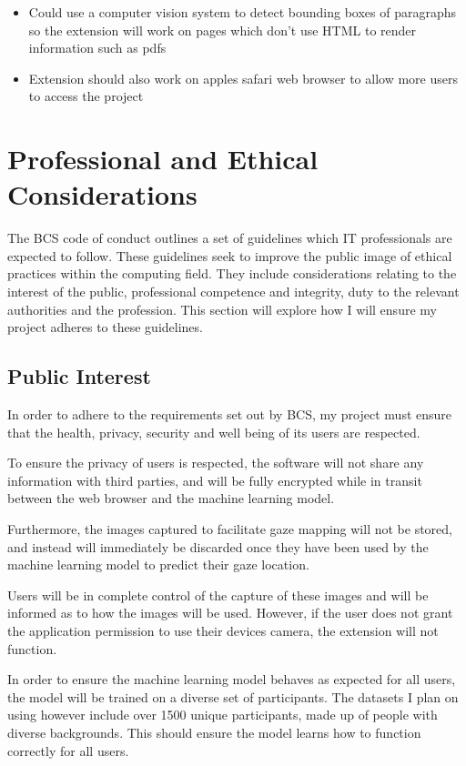 \documentclass[twocolumn]{report}
\begin{document}
\begin{itemize}
    \item Could use a computer vision system to detect bounding boxes of paragraphs so the extension will work on pages which don't use HTML to render information such as pdfs 
    \item Extension should also work on apples safari web browser to allow more users to access the project  
\end{itemize}

\chapter{Professional and Ethical Considerations}

\noindent
The BCS code of conduct \cite{bcs2022coc} outlines a set of guidelines which IT professionals are expected to follow. These guidelines seek to improve the public image of ethical practices within the computing field. They include considerations relating to the interest of the public, professional competence and integrity, duty to the relevant authorities and the profession. This section will explore how I will ensure my project adheres to these guidelines. 

\section{Public Interest}   

In order to adhere to the requirements set out by BCS, my project must ensure that the health, privacy, security and well being of its users are respected. 

To ensure the privacy of users is respected, the software will not share any information with third parties, and will be fully encrypted while in transit between the web browser and the machine learning model. 

Furthermore, the images captured to facilitate gaze mapping will not be stored, and instead will immediately be discarded once they have been used by the machine learning model to predict their gaze location.

Users will be in complete control of the capture of these images and will be informed as to how the images will be used. However, if the user does not grant the application permission to use their devices camera, the extension will not function. 

In order to ensure the machine learning model behaves as expected for all users, the model will be trained on a diverse set of participants. The datasets I plan on using however include over 1500 unique participants, made up of people with diverse backgrounds. This should ensure the model learns how to function correctly for all users. 
\end{document}
